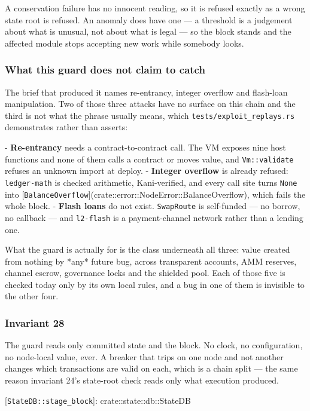 \documentclass[11pt,a4paper]{article}
\begin{document}
A conservation failure has no innocent reading, so it is refused exactly as
a wrong state root is refused. An anomaly does have one — a threshold is a
judgement about what is unusual, not about what is legal — so the block
stands and the affected module stops accepting new work while somebody
looks.

\subsubsection{What this guard does not claim to catch}

The brief that produced it names re-entrancy, integer overflow and
flash-loan manipulation. Two of those three attacks have no surface on this
chain and the third is not what the phrase usually means, which
\texttt{tests/exploit\_replays.rs} demonstrates rather than asserts:

- \textbf{Re-entrancy} needs a contract-to-contract call. The VM exposes nine
  host functions and none of them calls a contract or moves value, and
  \texttt{Vm::validate} refuses an unknown import at deploy.
- \textbf{Integer overflow} is already refused: \texttt{ledger-math} is checked
  arithmetic, Kani-verified, and every call site turns \texttt{None} into
  [\texttt{BalanceOverflow}](crate::error::NodeError::BalanceOverflow), which
  fails the whole block.
- \textbf{Flash loans} do not exist. \texttt{SwapRoute} is self-funded — no borrow, no
  callback — and \texttt{l2-flash} is a payment-channel network rather than a
  lending one.

What the guard is actually for is the class underneath all three: value
created from nothing by *any* future bug, across transparent accounts, AMM
reserves, channel escrow, governance locks and the shielded pool. Each of
those five is checked today only by its own local rules, and a bug in one of
them is invisible to the other four.

\subsubsection{Invariant 28}

The guard reads only committed state and the block. No clock, no
configuration, no node-local value, ever. A breaker that trips on one node
and not another changes which transactions are valid on each, which is a
chain split — the same reason invariant 24's state-root check reads only
what execution produced.

[\texttt{StateDB::stage\_block}]: crate::state::db::StateDB
\end{document}
